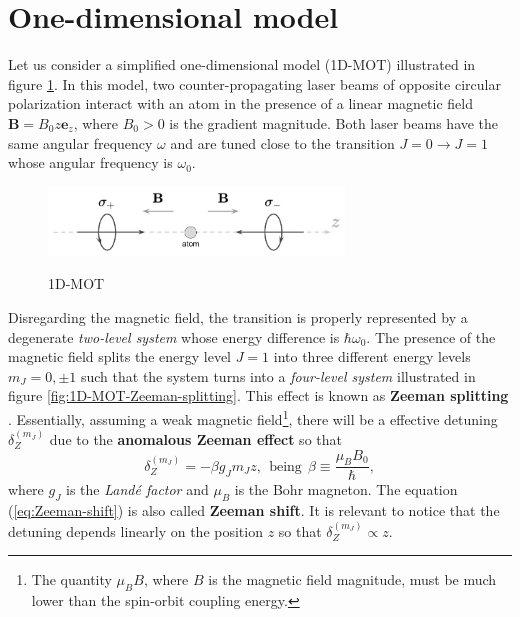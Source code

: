%
\section{One-dimensional model}
\label{sec:one-dimensional-model}
%

Let us consider a simplified one-dimensional model (1D-MOT) illustrated in figure \ref{fig:1D-MOT}. In this model, two counter-propagating laser beams of opposite circular polarization interact with an atom in the presence of a linear magnetic field $ \mathbf{B} = B_0 z \mathbf{e}_z $, where $ B_0 > 0 $ is the gradient magnitude. Both laser beams have the same angular frequency $ \omega $ and are tuned close to the transition $ J = 0 \rightarrow J = 1 $ whose angular frequency is $ \omega_0 $.

\begin{figure}[!ht]
	\centering
	\caption{1D-MOT}
	\includegraphics[width=0.7\textwidth]{USPSC-img/1D-MOT.png}
	\vspace{5pt}
	\label{fig:1D-MOT}
	\vspace{-10pt}
\end{figure}

Disregarding the magnetic field, the transition is properly represented by a degenerate \textit{two-level system} whose energy difference is $ \hbar \omega_0 $. The presence of the magnetic field splits the energy level $ J = 1 $ into three different energy levels $ m_J = 0, \pm 1 $ such that the system turns into a \textit{four-level system} illustrated in figure \ref{fig:1D-MOT-Zeeman-splitting}. This effect is known as \textbf{Zeeman splitting} \cite[Section~7.4]{steck2007quantum}. Essentially, assuming a weak magnetic field\footnote{The quantity $ \mu_B B $, where $ B $ is the magnetic field magnitude, must be much lower than the spin-orbit coupling energy.}, there will be a effective detuning $ \delta_Z^{(m_J)} $ due to the \textbf{anomalous Zeeman effect} so that
\begin{equation}
	\delta_Z^{(m_J)} = - \beta g_{J} m_J z,\ \ \textrm{being}\ \ \beta \equiv \frac{\mu_B B_0}{\hbar},
	\label{eq:Zeeman-shift}
\end{equation}
where $ g_J $ is the \textit{Landé factor} and $ \mu_B $ is the Bohr magneton. The equation (\ref{eq:Zeeman-shift}) is also called \textbf{Zeeman shift}. It is relevant to notice that the detuning depends linearly on the position $ z $ so that $ \delta_Z^{(m_J)} \propto z $.

